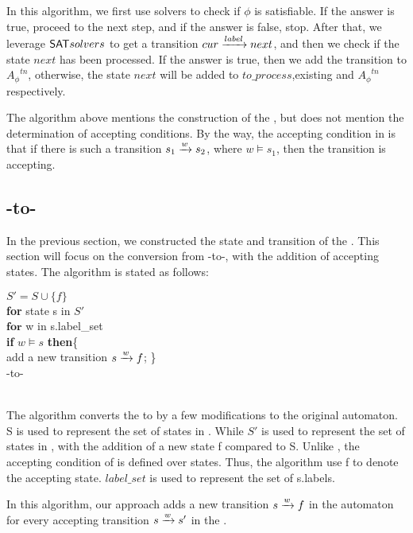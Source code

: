 In this algorithm, we first use \SAT solvers to check if $\phi$ is satisfiable. If the answer is true, proceed to the next step, and if the answer is false, stop. After that, we leverage ${\sf SAT} solvers$ to get a transition $cur\xrightarrow[]{label}next$, and then we check if the state $next$ has been processed. If the answer is true, then we add the transition to ${A_{\phi}}^{tn}$, otherwise, the state $next$ will be added to  $to\_process$,existing and ${A_{\phi}}^{tn}$ respectively. 


The algorithm above mentions the construction of the \TNFA, but does not mention the determination of accepting conditions. By the way, the accepting condition in \TNFA is that if there is such a transition $s_1\xrightarrow[]{w}s_2$, where $w\models s_1$, then the transition is accepting.  


\subsection{\TNFA-to-\NFA}  
In the previous section, we constructed the state and transition of the \TNFA. This section will focus on the conversion from \TNFA-to-\NFA, with the addition of accepting states. The algorithm is stated as follows:\\

\IncMargin{1em}
 \begin{algorithm}[H]
    \SetAlgoNoLine
    \BlankLine
$S' = S\cup \{f\}$\\
\textbf{for} state s in $S'$ \\
\qquad  $ \textbf{for}$ w in s.label\_set  \\
\qquad  \quad \textbf{if} $w \models s$   \textbf{then}\{      \\
\qquad \qquad add a new transition $s\xrightarrow[]{w}f$;    \}     \\
 \caption{\TNFA-to-\NFA}
\end{algorithm}
~\\
The algorithm converts the \TNFA to \NFA by a few modifications to the original automaton. S is used to represent the set of states in \TNFA. While $S'$ is used to represent the set of states in \NFA, with the addition of a new state f compared to S. Unlike \TNFA, the accepting condition of \NFA is defined over states. Thus, the algorithm use f to denote the accepting state. $label\_set$ is used to represent the set of s.labels. 

In this algorithm, our approach adds a new transition $s\xrightarrow[]{w}f$ in the automaton for every accepting transition $s\xrightarrow[]{w}s'$ in the \TNFA. 
